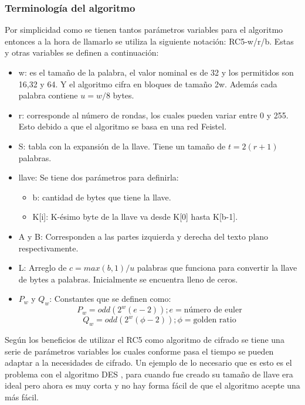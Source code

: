 \subsubsection{Terminología del algoritmo}
Por simplicidad como se tienen tantos parámetros variables para el algoritmo entonces a la hora de llamarlo se utiliza la siguiente notación: RC5-w/r/b. Estas y otras variables se definen a continuación:

\begin{itemize}
\item w: es el tamaño de la palabra, el valor nominal es de 32 y los permitidos son 16,32 y 64. Y el algoritmo cifra en bloques de tamaño 2w. Además cada palabra contiene $u=w/8$ bytes.

\item r: corresponde al número de rondas, los cuales pueden variar entre 0 y 255. Esto debido a que el algoritmo se basa en una red Feistel.
 
\item S: tabla con la expansión de la llave. Tiene un tamaño de $t= 2(r+1)$ palabras.

\item llave: Se tiene dos parámetros para definirla:
\begin{itemize}
\item b: cantidad de bytes que tiene la llave.
\item K[i]: K-ésimo byte de la llave va desde K[0] hasta K[b-1].
\end{itemize}

\item A y B: Corresponden a las partes izquierda y derecha del texto plano respectivamente.

\item L: Arreglo de $c=max(b,1)/u$ palabras que funciona para convertir la llave de bytes a palabras. Inicialmente se encuentra lleno de ceros.

\item $P_w$ y $Q_w$: Constantes que se definen como:
\begin{equation}
P_w = odd(2^w(e-2)); e = \text{número de euler}
\end{equation}
\begin{equation}
Q_w = odd(2^w(\phi-2)); \phi = \text{golden ratio}
\end{equation}
\end{itemize}



Según \cite{rivest} los beneficios de utilizar el RC5 como algoritmo de cifrado se tiene una serie de parámetros variables los cuales conforme pasa el tiempo se pueden adaptar a la necesidades de cifrado. Un ejemplo de lo necesario que es esto es el problema con el algoritmo DES , para cuando fue creado su tamaño de llave era ideal pero ahora es muy corta y no hay forma fácil de que el algoritmo acepte una más fácil.

